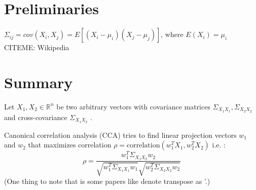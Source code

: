 \documentclass[11pt]{article}
\begin{document}
\section{Preliminaries}
$\Sigma_{ij} = cov(X_i, X_j) = E[(X_i - \mu_i)(X_j - \mu_j)]$, where $E(X_i) = \mu_i$ CITEME: Wikipedia

\section{Summary}
Let $X_1, X_2 \in \mathbb{R}^n$ be two arbitrary vectors with covariance matrices $\Sigma_{X_1X_1}, \Sigma_{X_2X_2}$ and cross-covariance $\Sigma_{X_1X_2}$ \cite{galen2013-deep-cca}. 

Canonical correlation analysis (CCA) tries to find linear projection vectors $w_1$ and $w_2$ that maximizes correlation $\rho = \mbox{correlation}(w_1^TX_1, w_2^TX_2)$ i.e. \cite{cca_tutorial}:
$$
\rho = \frac{w_1^{T} \Sigma_{X_1X_2} w_2}{\sqrt{w_1^T \Sigma_{X_1X_1} w_1} \sqrt{w_2^T \Sigma_{X_2X_2} w_2} }
$$
(One thing to note that is some papers like \cite{galen2013-deep-cca} denote transpose as '.)



\end{document}
